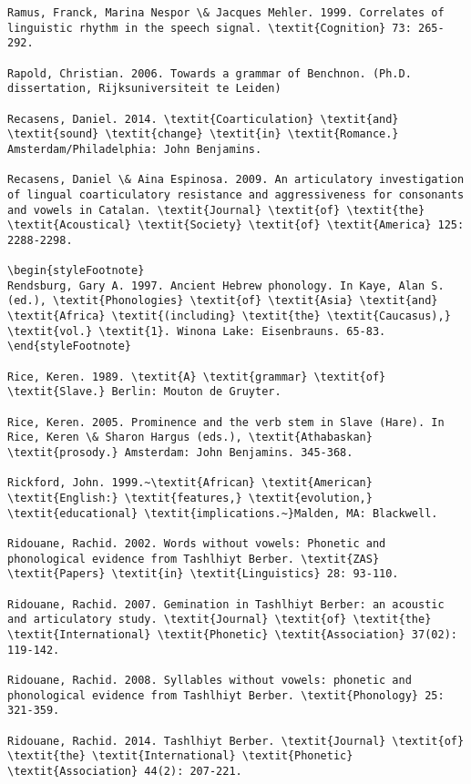 \begin{verbatim}
Ramus, Franck, Marina Nespor \& Jacques Mehler. 1999. Correlates of linguistic rhythm in the speech signal. \textit{Cognition} 73: 265-292.

Rapold, Christian. 2006. Towards a grammar of Benchnon. (Ph.D. dissertation, Rijksuniversiteit te Leiden)

Recasens, Daniel. 2014. \textit{Coarticulation} \textit{and} \textit{sound} \textit{change} \textit{in} \textit{Romance.} Amsterdam/Philadelphia: John Benjamins.

Recasens, Daniel \& Aina Espinosa. 2009. An articulatory investigation of lingual coarticulatory resistance and aggressiveness for consonants and vowels in Catalan. \textit{Journal} \textit{of} \textit{the} \textit{Acoustical} \textit{Society} \textit{of} \textit{America} 125: 2288-2298.

\begin{styleFootnote}
Rendsburg, Gary A. 1997. Ancient Hebrew phonology. In Kaye, Alan S. (ed.), \textit{Phonologies} \textit{of} \textit{Asia} \textit{and} \textit{Africa} \textit{(including} \textit{the} \textit{Caucasus),} \textit{vol.} \textit{1}. Winona Lake: Eisenbrauns. 65-83.
\end{styleFootnote}

Rice, Keren. 1989. \textit{A} \textit{grammar} \textit{of} \textit{Slave.} Berlin: Mouton de Gruyter.

Rice, Keren. 2005. Prominence and the verb stem in Slave (Hare). In Rice, Keren \& Sharon Hargus (eds.), \textit{Athabaskan} \textit{prosody.} Amsterdam: John Benjamins. 345-368.

Rickford, John. 1999.~\textit{African} \textit{American} \textit{English:} \textit{features,} \textit{evolution,} \textit{educational} \textit{implications.~}Malden, MA: Blackwell. 

Ridouane, Rachid. 2002. Words without vowels: Phonetic and phonological evidence from Tashlhiyt Berber. \textit{ZAS} \textit{Papers} \textit{in} \textit{Linguistics} 28: 93-110.

Ridouane, Rachid. 2007. Gemination in Tashlhiyt Berber: an acoustic and articulatory study. \textit{Journal} \textit{of} \textit{the} \textit{International} \textit{Phonetic} \textit{Association} 37(02): 119-142.

Ridouane, Rachid. 2008. Syllables without vowels: phonetic and phonological evidence from Tashlhiyt Berber. \textit{Phonology} 25: 321-359.

Ridouane, Rachid. 2014. Tashlhiyt Berber. \textit{Journal} \textit{of} \textit{the} \textit{International} \textit{Phonetic} \textit{Association} 44(2): 207-221.


\end{verbatim}
